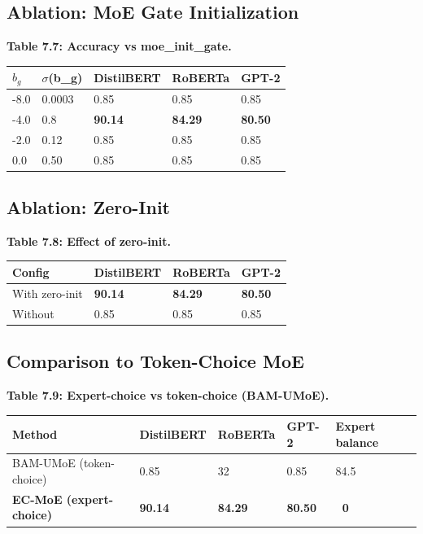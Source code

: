 \subsection{Ablation: MoE Gate Initialization}

\textbf{Table 7.7: Accuracy vs moe\_init\_gate.}

\begin{table}[H]
\centering
\small
\begin{tabular}{lllll}
\toprule
\textbf{$b_g$} & \textbf{$\sigma$(b\_g)} & \textbf{DistilBERT} & \textbf{RoBERTa} & \textbf{GPT-2} \\
\midrule
-8.0 & 0.0003 & 0.85 & 0.85 & 0.85 \\
-4.0 & 0.8 & \textbf{90.14} & \textbf{84.29} & \textbf{80.50} \\
-2.0 & 0.12 & 0.85 & 0.85 & 0.85 \\
0.0 & 0.50 & 0.85 & 0.85 & 0.85 \\
\bottomrule
\end{tabular}
\end{table}

\subsection{Ablation: Zero-Init}

\textbf{Table 7.8: Effect of zero-init.}

\begin{table}[H]
\centering
\small
\begin{tabular}{llll}
\toprule
\textbf{Config} & \textbf{DistilBERT} & \textbf{RoBERTa} & \textbf{GPT-2} \\
\midrule
With zero-init & \textbf{90.14} & \textbf{84.29} & \textbf{80.50} \\
Without & 0.85 & 0.85 & 0.85 \\
\bottomrule
\end{tabular}
\end{table}

\subsection{Comparison to Token-Choice MoE}

\textbf{Table 7.9: Expert-choice vs token-choice (BAM-UMoE).}

\begin{table}[H]
\centering
\small
\begin{tabular}{lllll}
\toprule
\textbf{Method} & \textbf{DistilBERT} & \textbf{RoBERTa} & \textbf{GPT-2} & \textbf{Expert balance} \\
\midrule
BAM-UMoE (token-choice) & 0.85 & 32 & 0.85 & 84.5 \\
\textbf{EC-MoE (expert-choice)} & \textbf{90.14} & \textbf{84.29} & \textbf{80.50} & \textbf{~0} \\
\bottomrule
\end{tabular}
\end{table}

